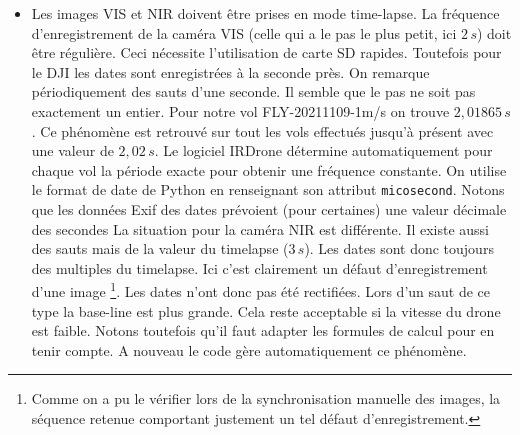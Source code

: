 \documentclass[a4paper,11pt]{report}
\begin{document}
\begin{itemize}
	\item Les images VIS et NIR doivent être prises en mode time-lapse. 
	La fréquence d'enregistrement de la caméra VIS (celle qui a le pas le plus petit, ici $2\,s$) doit être régulière. 
	Ceci nécessite l'utilisation de carte SD rapides. Toutefois pour le DJI les dates sont enregistrées à la seconde près. On remarque périodiquement des sauts d'une seconde. Il semble que le pas ne soit pas exactement un entier. Pour notre vol FLY-20211109-1m/s on trouve $2,01865 \, s$. Ce phénomène est retrouvé sur tout les vols effectués jusqu'à présent avec une valeur de $2,02 \, s$. Le logiciel IRDrone détermine automatiquement pour chaque vol la période exacte pour obtenir une fréquence constante.  
	On utilise le format de date de Python en  renseignant son attribut \texttt{micosecond}. 
	Notons que les données Exif des dates prévoient (pour certaines) une valeur décimale des secondes  
	La situation pour la caméra NIR est différente. Il existe aussi des sauts mais de la valeur du timelapse ($3\,s$). Les dates sont donc toujours des multiples du timelapse. Ici c'est clairement un défaut d'enregistrement d'une image
	\footnote{Comme on a pu le vérifier lors de la synchronisation manuelle des images, la séquence retenue  comportant justement un tel défaut d'enregistrement.}. Les dates n'ont donc pas été rectifiées. Lors d'un saut de ce type la \og base-line\fg{} est plus grande. Cela reste acceptable si la vitesse du drone est faible. Notons toutefois qu'il faut adapter les formules de calcul pour en tenir compte. A nouveau le code gère automatiquement ce phénomène.\\
	

\end{itemize}
\end{document}
